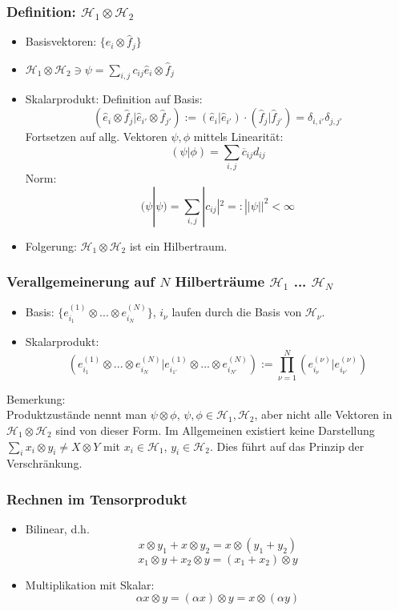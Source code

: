 \documentclass[twoside,a4paper]{scrartcl}
\renewcommand{\1}{\mathds{1}}
\begin{document}
\subsubsection*{Definition: $\mathcal H_1 \otimes \mathcal H_2$}
\begin{itemize}
 \item Basisvektoren: $\{ \hat e_i \otimes \hat f_j\}$
 \item $\mathcal H_1 \otimes \mathcal H_2 \ni \psi= \sum_{i,j} c_{ij} \hat e_i \otimes \hat f_j$
 \item Skalarprodukt: 
Definition auf Basis:$$(\hat e_i \otimes \hat f_j |\hat e_{i'} \otimes \hat f_{j'}):= (\hat e_i|\hat e_{i'})\cdot(\hat f_j|\hat f_{j'})=\delta_{i,i'}\delta_{j,j'}$$
Fortsetzen auf allg. Vektoren $\psi, \phi$ mittels Linearität:
$$(\psi|\phi)=\sum_{i,j} \overline c_{ij} d_{ij}$$
Norm:
$$(\psi|\psi)=\sum_{i,j} |c_{ij}|^2=:||\psi||^2<\infty$$
 \item Folgerung:
$\mathcal H_1 \otimes \mathcal H_2$ ist ein Hilbertraum.\\
\end{itemize}
\subsubsection*{Verallgemeinerung auf $N$ Hilberträume $\mathcal H_1$ ... $\mathcal H_N$}
\begin{itemize}
 \item Basis: $\{e_{i_1}^{(1)}\otimes ... \otimes e_{i_N}^{(N)} \}$, $i_\nu$ laufen durch die Basis von $\mathcal H_\nu$.
 \item Skalarprodukt:  $$(e_{i_1}^{(1)}\otimes ... \otimes e_{i_N}^{(N)}|e_{i_{1'}}^{(1)}\otimes ... \otimes e_{i_{N'}}^{(N)}):=\prod_{\nu=1}^N (e_{i_\nu}^{(\nu)} |e_{i_{\nu'}}^{(\nu)})$$
\end{itemize}
Bemerkung:\\
Produktzustände nennt man $\psi \otimes \phi$, $\psi,\phi \in \mathcal H_1,\mathcal H_2$, aber nicht alle Vektoren in $\mathcal H_1 \otimes \mathcal H_2$ sind von dieser Form. Im Allgemeinen existiert keine Darstellung $\sum_i x_i \otimes y_i \neq X \otimes Y$ mit $x_i \in \mathcal H_1$, $y_i \in \mathcal H_2$. Dies führt auf das Prinzip der Verschränkung.
\subsubsection*{Rechnen im Tensorprodukt}
\begin{itemize}
 \item Bilinear, d.h. $$x \otimes y_1+x\otimes y_2=x\otimes(y_1+y_2) $$
$$x_1 \otimes y+x_2\otimes y=(x_1+x_2)\otimes y $$
\item Multiplikation mit Skalar:
$$\alpha x \otimes y = (\alpha x)\otimes y=x \otimes (\alpha y)$$
\end{itemize}
\end{document}
